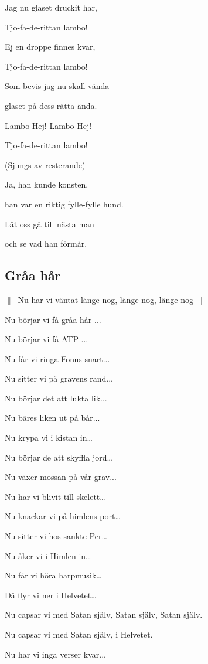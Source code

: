 Jag nu glaset druckit har,

Tjo-fa-de-rittan lambo!

Ej en droppe finnes kvar,

Tjo-fa-de-rittan lambo!

Som bevis jag nu skall vända

glaset på dess rätta ända.

Lambo-Hej! Lambo-Hej!

Tjo-fa-de-rittan lambo!\bigskip

(Sjungs av resterande)

Ja, han kunde konsten,

han var en riktig fylle-fylle hund.

Låt oss gå till nästa man

och se vad han förmår. 

\subsection{\textbf{Gråa hår }}

$\|\:$ Nu har vi väntat länge nog, länge nog, länge nog $\:\|$\bigskip

Nu börjar vi få gråa hår ...\bigskip

Nu börjar vi få ATP ...\bigskip

Nu får vi ringa Fonus snart...\bigskip

Nu sitter vi på gravens rand... \bigskip

Nu börjar det att lukta lik...\bigskip

Nu bäres liken ut på bår...\bigskip

Nu krypa vi i kistan in…\bigskip

Nu börjar de att skyffla jord…\bigskip

Nu växer mossan på vår grav...\bigskip

Nu har vi blivit till skelett…\bigskip

Nu knackar vi på himlens port…\bigskip

Nu sitter vi hos sankte Per…\bigskip

Nu åker vi i Himlen in…\bigskip

Nu får vi höra harpmusik…\bigskip

Då flyr vi ner i Helvetet…\bigskip

Nu capsar vi med Satan själv, Satan själv,
Satan själv.

Nu capsar vi med Satan själv, i Helvetet.\bigskip

Nu har vi inga verser kvar... 

